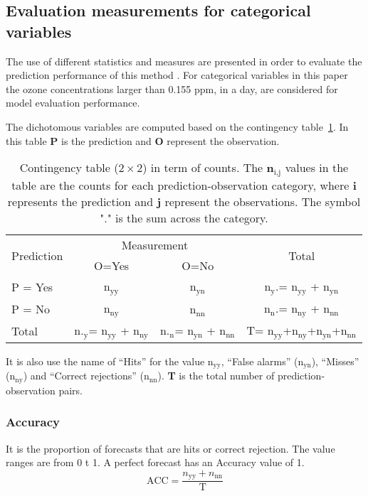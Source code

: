 \subsection{Evaluation measurements for categorical variables}
The use of different statistics and measures are presented in order to evaluate the prediction performance of this method 
\cite{METusrGuide}. For categorical variables in this paper the ozone concentrations larger than 0.155 ppm, in a day, are 
considered for model evaluation performance.

The dichotomous variables are computed based on the contingency table~\ref{cont}. In this table \textbf{P} is the 
prediction and \textbf{O} represent the observation. 

\begin{table}
\begin{scriptsize}
\caption{Contingency table ($2\times2$) in term of counts. The \textbf{n$_\text{i,j}$} values in the table are the counts for each prediction-observation category, where \textbf{i} represents the prediction and \textbf{j} represent the observations. The symbol "." is the sum across the category.}
\begin{tabular}{|l|c|c|c|}\hline
 \multirow{2}{*}{Prediction} & \multicolumn{2}{c}{Measurement}\vline & \multirow{2}{*}{Total} \\ \cline{2-3}
&O=Yes &O=No & \\ \hline
P = Yes & n$_\textrm{yy}$ &n$_\textrm{yn}$& n$_\textrm{y}.$= n$_\textrm{yy}$ + n$_\textrm{yn}$\\ \hline 
P = No & n$_\textrm{ny}$ &n$_\textrm{nn}$& n$_\textrm{n}.$= n$_\textrm{ny}$ + n$_\textrm{nn}$\\ \hline 
Total & n$._\textrm{y}$= n$_\textrm{yy}$ + n$_\textrm{ny}$ &n$._\textrm{n}$= n$_\textrm{yn}$ + n$_\textrm{nn}$&T= n$_\textrm{yy}$+n$_\textrm{ny}$+n$_\textrm{yn}$+n$_\textrm{nn}$ \\ \hline
\end{tabular}
\end{scriptsize}
\label{cont}
\end{table}
It is also use the name of ``Hits'' for the value n$_\textrm{yy}$, ``False alarms'' (n$_\textrm{yn}$), ``Misses'' (n$_\textrm{ny}$) and ``Correct rejections'' (n$_\textrm{nn}$). \textbf{T} is the total number of prediction-observation pairs.
\subsubsection{Accuracy}
It is the proportion of forecasts that are hits or correct rejection. The value ranges are from 0 t 1. A perfect forecast has an Accuracy value of 1.
\begin{equation}
\textrm{ACC}=\frac{n_\textrm{yy}+n_\textrm{nn}}{\textrm{T}}
\end{equation}
